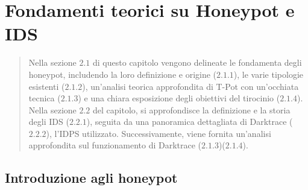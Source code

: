 \chapter{Fondamenti teorici su Honeypot e IDS}
\begin{quote}
	{\small Nella sezione $2.1$ di questo capitolo vengono delineate le fondamenta degli honeypot, includendo la loro definizione e origine ($2.1.1$), le varie tipologie esistenti ($2.1.2$), un'analisi teorica approfondita di T-Pot con un'occhiata tecnica ($2.1.3$) e una chiara esposizione degli obiettivi del tirocinio ($2.1.4$).\\
	Nella sezione $2.2$ del capitolo, si approfondisce la definizione e la storia degli IDS ($2.2.1$), seguita da una panoramica dettagliata di Darktrace ($2.2.2$), l'IDPS utilizzato. Successivamente, viene fornita un'analisi approfondita sul funzionamento di Darktrace ($2.1.3$)($2.1.4$).}
\end{quote} 
\section{Introduzione agli honeypot}
